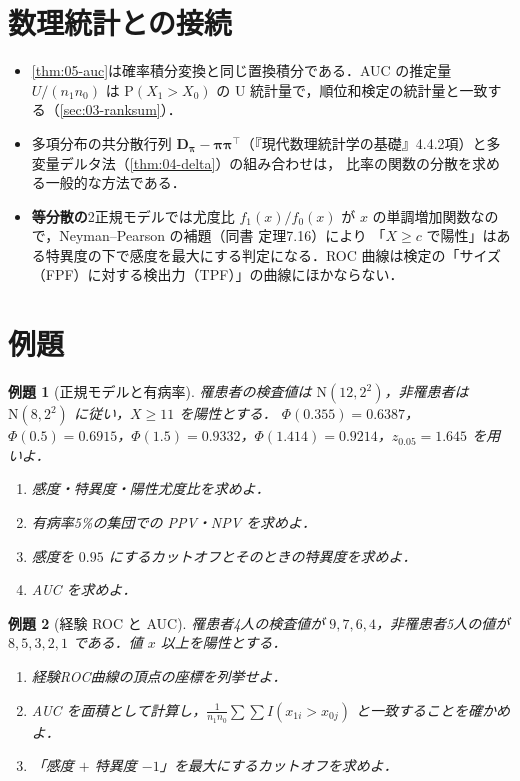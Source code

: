 \documentclass[a4paper,11pt,openany]{ltjsbook}
\newtheorem{reidai}{例題}[chapter]
\newcommand{\Prob}{\mathrm{P}}
\newcommand{\Normal}{\mathrm{N}}
\newcommand{\transp}{^{\top}}
\begin{document}
\section{数理統計との接続}\label{sec:05-link}
\begin{linkbox}
\begin{itemize}
\item \cref{thm:05-auc}は確率積分変換と同じ置換積分である．AUC の推定量 $U/(n_1n_0)$ は $\Prob(X_1>X_0)$ の U 統計量で，順位和検定の統計量と一致する（\cref{sec:03-ranksum}）．
\item 多項分布の共分散行列 $\bm D_{\bm\pi}-\bm\pi\bm\pi\transp$（『現代数理統計学の基礎』4.4.2項）と多変量デルタ法（\cref{thm:04-delta}）の組み合わせは，
      比率の関数の分散を求める一般的な方法である．
\item \textbf{等分散の}2正規モデルでは尤度比 $f_1(x)/f_0(x)$ が $x$ の単調増加関数なので，Neyman--Pearson の補題（同書 定理7.16）により
      「$X\ge c$ で陽性」はある特異度の下で感度を最大にする判定になる．ROC 曲線は検定の「サイズ（FPF）に対する検出力（TPF）」の曲線にほかならない．
\end{itemize}
\end{linkbox}

\section{例題}\label{sec:05-ex}
\begin{reidai}[正規モデルと有病率]\label{reidai:05-1}
罹患者の検査値は $\Normal(12,2^2)$，非罹患者は $\Normal(8,2^2)$ に従い，$X\ge11$ を陽性とする．
$\Phi(0.355)=0.6387$，$\Phi(0.5)=0.6915$，$\Phi(1.5)=0.9332$，$\Phi(1.414)=0.9214$，$z_{0.05}=1.645$ を用いよ．
\begin{enumerate}[label=(\arabic*)]
\item 感度・特異度・陽性尤度比を求めよ．
\item 有病率5\%の集団での PPV・NPV を求めよ．
\item 感度を $0.95$ にするカットオフとそのときの特異度を求めよ．
\item AUC を求めよ．
\end{enumerate}
\end{reidai}

\begin{reidai}[経験 ROC と AUC]\label{reidai:05-2}
罹患者4人の検査値が $9,7,6,4$，非罹患者5人の値が $8,5,3,2,1$ である．値 $x$ 以上を陽性とする．
\begin{enumerate}[label=(\arabic*)]
\item 経験ROC曲線の頂点の座標を列挙せよ．
\item AUC を面積として計算し，$\frac{1}{n_1n_0}\sum\sum I(x_{1i}>x_{0j})$ と一致することを確かめよ．
\item 「感度 $+$ 特異度 $-1$」を最大にするカットオフを求めよ．
\end{enumerate}
\end{reidai}
\end{document}
